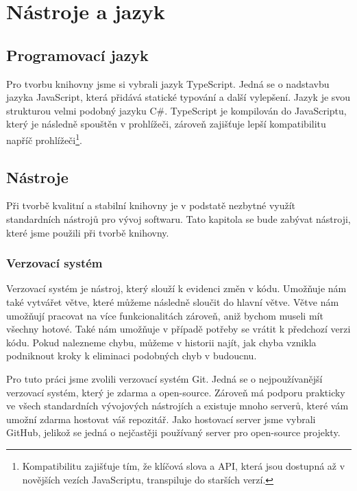 \chapter{Nástroje a jazyk}
\label{chap:technologies}

\section{Programovací jazyk}
\label{sec:programming-language}

Pro tvorbu knihovny jsme si vybrali jazyk TypeScript. 
Jedná se o nadstavbu jazyka JavaScript, která přidává statické typování a další vylepšení\cite{TypeScript:handbook}. 
Jazyk je svou strukturou velmi podobný jazyku C\#.
TypeScript je kompilován do JavaScriptu\cite{TypeScript}, který je následně spouštěn v prohlížeči, zároveň zajišťuje lepší kompatibilitu napříč prohlížeči\footnote{Kompatibilitu zajišťuje tím, že klíčová slova a API, která jsou dostupná až v novějších vezích JavaScriptu, transpiluje do starších verzí.}\cite{TypeScript:tsconfig}.

\section{Nástroje}
\label{sec:tools}

Při tvorbě kvalitní a stabilní knihovny je v podstatě nezbytné využít standardních nástrojů pro vývoj softwaru. 
Tato kapitola se bude zabývat nástroji, které jsme použili při tvorbě knihovny.

\subsection{Verzovací systém}
\label{subsec:version-control}

Verzovací systém je nástroj, který slouží k evidenci změn v kódu. 
Umožňuje nám také vytvářet větve, které můžeme následně sloučit do hlavní větve\cite{Git:branches,wikipedia:version-control}. 
Větve nám umožňují pracovat na více funkcionalitách zároveň, aniž bychom museli mít všechny hotové. 
Také nám umožňuje v případě potřeby se vrátit k předchozí verzi kódu.
 Pokud nalezneme chybu, můžeme v historii najít, jak chyba vznikla podniknout kroky k eliminaci podobných chyb v budoucnu.

Pro tuto práci jsme zvolili verzovací systém Git. Jedná se o nejpoužívanější verzovací systém, který je zdarma a open-source\cite{Git}.
Zároveň má podporu prakticky ve všech standardních vývojových nástrojích a existuje mnoho serverů, které vám umožní zdarma hostovat váš repozitář.
Jako hostovací server jsme vybrali GitHub, jelikož se jedná o nejčastěji používaný server pro open-source projekty\cite{GitHub:about}.

